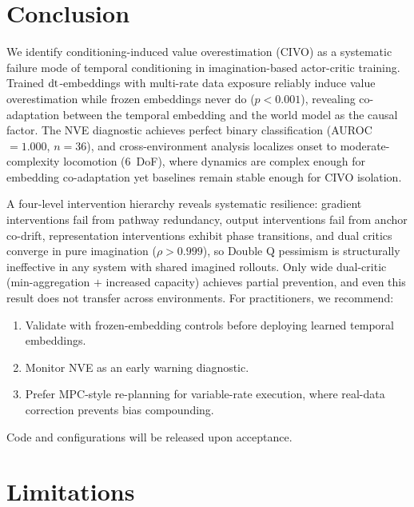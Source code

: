 \section{Conclusion}
\label{sec:conclusion}

 We identify conditioning-induced value overestimation (CIVO) as a systematic failure mode of temporal conditioning in imagination-based actor-critic training. Trained $\mathrm{dt}$-embeddings with multi-rate data exposure reliably induce value overestimation while frozen embeddings never do ($p < 0.001$), revealing co-adaptation between the temporal embedding and the world model as the causal factor. The NVE diagnostic achieves perfect binary classification (AUROC${=}1.000$, $n{=}36$), and cross-environment analysis localizes onset to moderate-complexity locomotion (6~DoF), where dynamics are complex enough for embedding co-adaptation yet baselines remain stable enough for CIVO isolation.

 A four-level intervention hierarchy reveals systematic resilience: gradient interventions fail from pathway redundancy, output interventions fail from anchor co-drift, representation interventions exhibit phase transitions, and dual critics converge in pure imagination ($\rho > 0.999$), so Double Q pessimism is structurally ineffective in any system with shared imagined rollouts. Only wide dual-critic (min-aggregation $+$ increased capacity) achieves partial prevention, and even this result does not transfer across environments. For practitioners, we recommend:
\begin{enumerate}[leftmargin=1.5em,itemsep=1pt,topsep=2pt]
\item Validate with frozen-embedding controls before deploying learned temporal embeddings.
\item Monitor NVE as an early warning diagnostic.
\item Prefer MPC-style re-planning for variable-rate execution, where real-data correction prevents bias compounding.
\end{enumerate} Code and configurations will be released upon acceptance.

\section{Limitations}
\label{sec:limitations}

